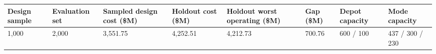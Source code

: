 \begin{tabular}{llllllll}
\toprule
Design sample & Evaluation set & Sampled design cost (\$M) & Holdout cost (\$M) & Holdout worst operating (\$M) & Gap (\$M) & Depot capacity & Mode capacity \\
\midrule
1,000 & 2,000 & 3,551.75 & 4,252.51 & 4,212.73 & 700.76 & 600 / 100 & 437 / 300 / 230 \\
\bottomrule
\end{tabular}

